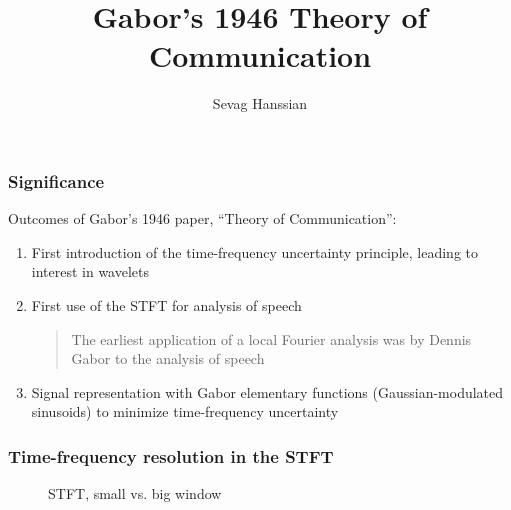 \documentclass{beamer}
\title{Gabor's 1946 Theory of Communication}
\author{Sevag Hanssian}
\institute{MUMT 622, Winter 2021}
\begin{document}
\begin{frame}
\maketitle
\end{frame}

\begin{frame}
	\frametitle{Significance}
	Outcomes of Gabor's 1946 paper, ``Theory of Communication'':
	\vspace{0.5em}
	\begin{enumerate}
		\item
			First introduction of the time-frequency uncertainty principle, leading to interest in wavelets
		\item
			First use of the STFT for analysis of speech
			\begin{quote}
			The earliest application of a local Fourier analysis was by Dennis Gabor to the analysis of speech
			\end{quote}
		\item
			\vspace{-0.35em}
			Signal representation with Gabor elementary functions (Gaussian-modulated sinusoids) to minimize time-frequency uncertainty
	\end{enumerate}
\end{frame}

\begin{frame}
	\frametitle{Time-frequency resolution in the STFT}
	\begin{figure}
		\centering
		\caption{STFT, small vs. big window}
	\end{figure}
\end{frame}
\end{document}

